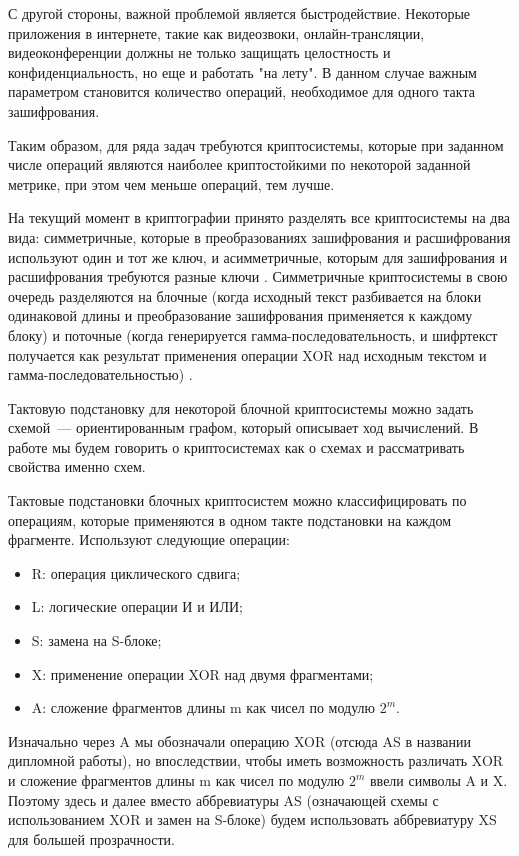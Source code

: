 \documentclass[a4paper,12pt]{report}
\theoremstyle{plain} %
\theoremstyle{definition}
\theoremstyle{remark}
\begin{document}
\begin{large}
С другой стороны, важной проблемой является быстродействие. Некоторые приложения в интернете, такие как видеозвоки, онлайн-трансляции, видеоконференции должны не только защищать целостность и конфиденциальность, но еще и работать "на лету". В данном случае важным параметром становится количество операций, необходимое для одного такта зашифрования.

Таким образом, для ряда задач требуются криптосистемы, которые при заданном числе операций являются наиболее криптостойкими по некоторой заданной метрике, при этом чем меньше операций, тем лучше.

На текущий момент в криптографии принято разделять все криптосистемы на два вида: симметричные, которые в преобразованиях зашифрования и расшифрования используют один и тот же ключ, и асимметричные, которым для зашифрования и расшифрования требуются разные ключи \cite{brassar}. Симметричные криптосистемы в свою очередь разделяются на блочные (когда исходный текст разбивается на блоки одинаковой длины и преобразование зашифрования применяется к каждому блоку) и поточные (когда генерируется гамма-последовательность, и шифртекст получается как результат применения операции XOR над исходным текстом и гамма-последовательностью) \cite{alferov}. 

Тактовую подстановку для некоторой блочной криптосистемы можно задать схемой~---
ориентированным графом, который описывает ход вычислений. В работе мы будем говорить о криптосистемах как о схемах и рассматривать свойства именно схем.

Тактовые подстановки блочных криптосистем можно классифицировать по операциям, которые применяются в одном такте подстановки на каждом фрагменте. Используют следующие операции:

\begin{itemize}
\item R: операция циклического сдвига;
\item L: логические операции И и ИЛИ;
\item S: замена на S-блоке;
\item X: применение операции XOR над двумя фрагментами;
\item A: сложение фрагментов длины m как чисел по модулю $2^m$.
\end{itemize}

Изначально через A мы обозначали операцию XOR (отсюда AS в названии дипломной работы), но впоследствии, чтобы иметь возможность различать XOR и сложение фрагментов длины m как чисел по модулю $2^m$ ввели символы A и X. Поэтому здесь и далее вместо аббревиатуры AS (означающей схемы с использованием XOR и замен на S-блоке) будем использовать аббревиатуру XS для большей прозрачности.


\end{large}
\end{document}
